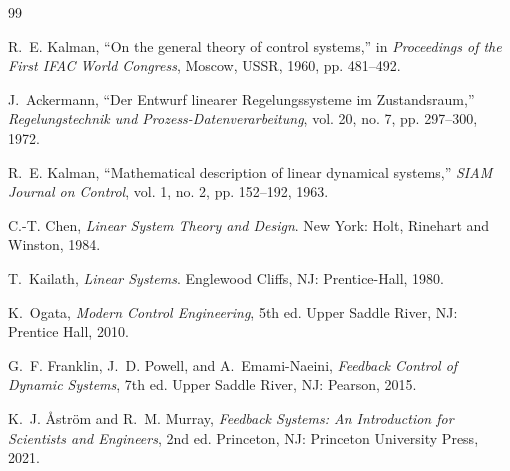 
\begin{thebibliography}{99}

R.~E. Kalman, ``On the general theory of control systems,'' in \textit{Proceedings of the First IFAC World Congress}, Moscow, USSR, 1960, pp. 481--492.

J.~Ackermann, ``Der Entwurf linearer Regelungssysteme im Zustandsraum,'' \textit{Regelungstechnik und Prozess-Datenverarbeitung}, vol. 20, no. 7, pp. 297--300, 1972.

R.~E. Kalman, ``Mathematical description of linear dynamical systems,'' \textit{SIAM Journal on Control}, vol. 1, no. 2, pp. 152--192, 1963.

C.-T. Chen, \textit{Linear System Theory and Design}. New York: Holt, Rinehart and Winston, 1984.

T.~Kailath, \textit{Linear Systems}. Englewood Cliffs, NJ: Prentice-Hall, 1980.

K.~Ogata, \textit{Modern Control Engineering}, 5th ed. Upper Saddle River, NJ: Prentice Hall, 2010.

G.~F. Franklin, J.~D. Powell, and A.~Emami-Naeini, \textit{Feedback Control of Dynamic Systems}, 7th ed. Upper Saddle River, NJ: Pearson, 2015.

K.~J. \r{A}str\"{o}m and R.~M. Murray, \textit{Feedback Systems: An Introduction for Scientists and Engineers}, 2nd ed. Princeton, NJ: Princeton University Press, 2021.

\end{thebibliography}

